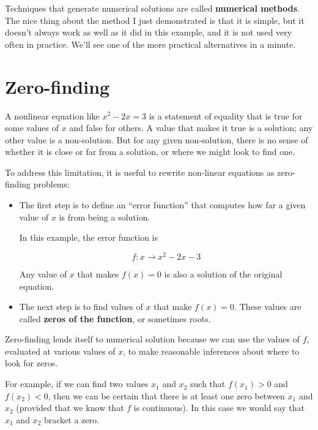 \documentclass{book}
\begin{document}
Techniques that generate numerical solutions are called
{\bf numerical methods}. The nice thing about the method I
just demonstrated is that it is simple, but it doesn't always
work as well as it did in this example, and it is not used
very often in practice. We'll see one of
the more practical alternatives in a minute.




\section{Zero-finding}
\label{zero}

A nonlinear equation like $x^2 - 2x = 3$ is a statement of
equality that is true for some values of $x$ and false for
others. A value that makes it true is a solution;
any other value is a non-solution. But for any given non-solution,
there is no sense of whether it is close or far from a solution,
or where we might look to find one.

To address this limitation, it is useful to
rewrite non-linear equations as zero-finding problems:

\begin{itemize}

\item The first step is to define
an ``error function'' that computes how far
a given value of $x$ is from being a solution.

In this example, the error function is

\[ f : x \to x^2 - 2x -3 \]

Any value of $x$ that makes $f(x) = 0$ is also a solution
of the original equation.

\item The next step is to find values of $x$ that make
$f(x) = 0$. These values are called {\bf zeros of the
function}, or sometimes roots.

\end{itemize}

Zero-finding lends itself to numerical solution because we can
use the values of $f$, evaluated at various values of $x$, to
make reasonable inferences about where to look for zeros.

For example, if we can find two values $x_1$ and $x_2$ such that
$f(x_1) > 0$ and $f(x_2) < 0$, then we can be certain that there is at
least one zero between $x_1$ and $x_2$ (provided that we know that $f$
is continuous). In this case we would say that $x_1$ and $x_2$
bracket a zero.
\end{document}
